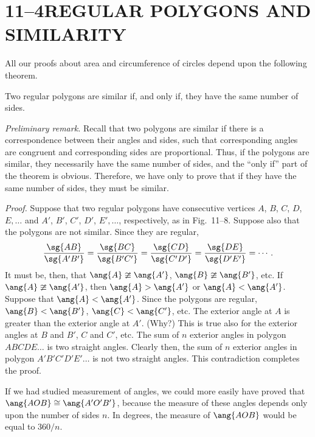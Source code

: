 \documentclass[11pt]{book}
\theoremstyle{bkplain}
\theoremstyle{XIplainnote}
\theoremstyle{bkplain}
\theoremstyle{bkplain}
\begin{document}
\section*{11--4\quad REGULAR POLYGONS AND SIMILARITY}

All our proofs about area and circumference of circles depend upon the
following theorem.

\begin{theorem}
Two regular polygons are similar if, and only if, they have the same number of
sides.
\end{theorem}

\noindent\emph{Preliminary remark.} Recall that two polygons are similar if
there is a correspondence between their angles and sides, such that
corresponding angles are congruent and corresponding sides are proportional.
Thus, if the polygons are similar, they necessarily have the same number of
sides, and the ``only if'' part of the theorem is obvious. Therefore, we have
only to prove that if they have the same number of sides, they must be similar.

\noindent\emph{Proof.} Suppose that two regular polygons have consecutive
vertices $A$, $B$, $C$, $D$, $E,\ldots$ and $A'$, $B'$, $C'$, $D'$,
$E',\ldots$, respectively, as in Fig.~11--8. Suppose also that the polygons are
not similar. Since they are regular,
\[
\frac{\sg{AB}}{\sg{A'B'}} = \frac{\sg{BC}}{\sg{B'C'}}
= \frac{\sg{CD}}{\sg{C'D'}} = \frac{\sg{DE}}{\sg{D'E'}} = \cdots.
\]
It must be, then, that $\ang{A} \ncong \ang{A'}$, $\ang{B} \ncong \ang{B'}$,
etc. If $\ang{A} \ncong \ang{A'}$, then $\ang{A} > \ang{A'}$ or
$\ang{A} < \ang{A'}$. Suppose that $\ang{A} < \ang{A'}$. Since the polygons are
regular, $\ang{B} < \ang{B'}$, $\ang{C} < \ang{C'}$, etc. The exterior angle at
$A$ is greater than the exterior angle at $A'$. (Why?) This is true also for
the exterior angles at $B$ and $B'$, $C$ and $C'$, etc. The sum of $n$ exterior
angles in polygon $ABCDE\ldots$ is two straight angles. Clearly then, the sum
of $n$ exterior angles in polygon $A'B'C'D'E'\ldots$ is not two straight
angles. This contradiction completes the proof.

\begin{remark}
If we had studied measurement of angles, we could more easily have proved that
$\ang{AOB} \cong \ang{A'O'B'}$, because the measure of these angles depends
only upon the number of sides $n$. In degrees, the measure of $\ang{AOB}$ would
be equal to $360/n$.
\end{remark}
\end{document}
